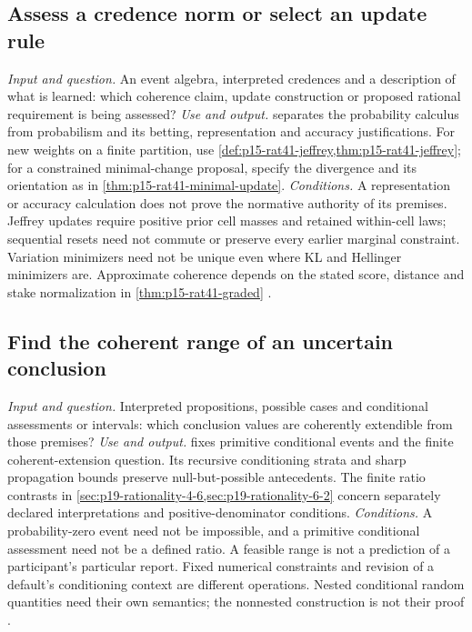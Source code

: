 \subsection{Assess a credence norm or select an update rule}
\label{sec:p14-finder-credence-dynamics}
\textit{Input and question.} An event algebra, interpreted credences and
a description of what is learned: which coherence claim, update construction
or proposed rational requirement is being assessed?
\textit{Use and output.}  separates the
probability calculus from probabilism and its betting, representation and
accuracy justifications. For new weights on a finite partition, use
\cref{def:p15-rat41-jeffrey,thm:p15-rat41-jeffrey}; for a constrained
minimal-change proposal, specify the divergence and its orientation as in
\cref{thm:p15-rat41-minimal-update}.
\textit{Conditions.} A representation or accuracy calculation does not
prove the normative authority of its premises. Jeffrey updates require
positive prior cell masses and retained within-cell laws; sequential resets
need not commute or preserve every earlier marginal constraint. Variation
minimizers need not be unique even where KL and Hellinger minimizers are.
Approximate coherence depends on the stated score, distance and stake
normalization in \cref{thm:p15-rat41-graded}
\cite{HajekStaffel2021Dynamics}.

\subsection{Find the coherent range of an uncertain conclusion}
\label{sec:p14-finder-probability-logic}
\textit{Input and question.} Interpreted propositions, possible cases and
conditional assessments or intervals: which conclusion values are coherently
extendible from those premises?
\textit{Use and output.}  fixes primitive
conditional events and the finite coherent-extension question. Its recursive
conditioning strata and sharp propagation bounds preserve null-but-possible
antecedents. The finite ratio contrasts in
\cref{sec:p19-rationality-4-6,sec:p19-rationality-6-2} concern separately
declared interpretations and positive-denominator conditions.
\textit{Conditions.} A probability-zero event need not be impossible, and
a primitive conditional assessment need not be a defined ratio. A feasible
range is not a prediction of a participant's particular report. Fixed
numerical constraints and revision of a default's conditioning context are
different operations. Nested conditional random quantities need their own
semantics; the nonnested construction is not their proof
\cite{Pfeifer2021ProbabilityLogic,OverCruz2021Suppositional}.

